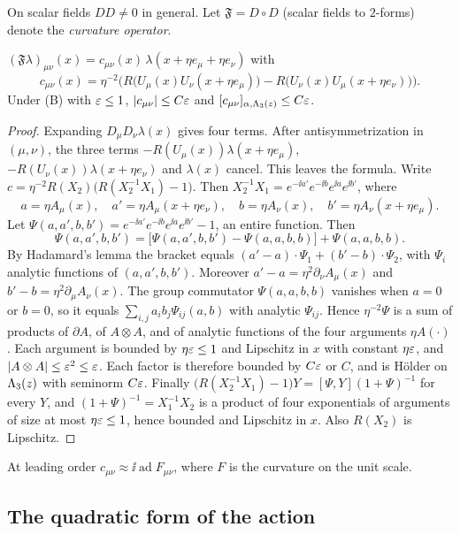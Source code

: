 On scalar fields $DD\ne0$ in general. Let $\mathfrak F=D\circ D$ (scalar fields to $2$-forms) denote the \emph{curvature operator}.

\begin{lemma}\label{lem:curvature}
$(\mathfrak F\lambda)_{\mu\nu}(x)=c_{\mu\nu}(x)\,\lambda(x+\eta e_\mu+\eta e_\nu)$ with
\[
c_{\mu\nu}(x)=\eta^{-2}\Big(R\big(U_\mu(x)U_\nu(x+\eta e_\mu)\big)-R\big(U_\nu(x)U_\mu(x+\eta e_\nu)\big)\Big).
\]
Under (B) with $\varepsilon\le1$, $|c_{\mu\nu}|\le C\varepsilon$ and $[c_{\mu\nu}]_{\alpha,\Lambda_3(z)}\le C\varepsilon$.
\end{lemma}

\begin{proof}
Expanding $D_\mu D_\nu\lambda(x)$ gives four terms. After antisymmetrization in $(\mu,\nu)$, the three terms $-R(U_\mu(x))\lambda(x+\eta e_\mu)$, $-R(U_\nu(x))\lambda(x+\eta e_\nu)$ and $\lambda(x)$ cancel. This leaves the formula. Write $c=\eta^{-2}R(X_2)\big(R(X_2^{-1}X_1)-1\big)$. Then $X_2^{-1}X_1=e^{-\ii a'}e^{-\ii b}e^{\ii a}e^{\ii b'}$, where
\[
a=\eta A_\mu(x),\quad a'=\eta A_\mu(x+\eta e_\nu),\quad b=\eta A_\nu(x),\quad b'=\eta A_\nu(x+\eta e_\mu).
\]
Let $\Psi(a,a',b,b')=e^{-\ii a'}e^{-\ii b}e^{\ii a}e^{\ii b'}-1$, an entire function. Then
\[
\Psi(a,a',b,b')=\big[\Psi(a,a',b,b')-\Psi(a,a,b,b)\big]+\Psi(a,a,b,b).
\]
By Hadamard's lemma the bracket equals $(a'-a)\cdot\Psi_1+(b'-b)\cdot\Psi_2$, with $\Psi_i$ analytic functions of $(a,a',b,b')$. Moreover $a'-a=\eta^2\partial_\nu A_\mu(x)$ and $b'-b=\eta^2\partial_\mu A_\nu(x)$. The group commutator $\Psi(a,a,b,b)$ vanishes when $a=0$ or $b=0$, so it equals $\sum_{i,j}a_ib_j\Psi_{ij}(a,b)$ with analytic $\Psi_{ij}$. Hence $\eta^{-2}\Psi$ is a sum of products of $\partial A$, of $A\otimes A$, and of analytic functions of the four arguments $\eta A(\cdot)$. Each argument is bounded by $\eta\varepsilon\le1$ and Lipschitz in $x$ with constant $\eta\varepsilon$, and $|A\otimes A|\le\varepsilon^2\le\varepsilon$. Each factor is therefore bounded by $C\varepsilon$ or $C$, and is H\"older on $\Lambda_3(z)$ with seminorm $C\varepsilon$. Finally $\big(R(X_2^{-1}X_1)-1\big)Y=[\Psi,Y](1+\Psi)^{-1}$ for every $Y$, and $(1+\Psi)^{-1}=X_1^{-1}X_2$ is a product of four exponentials of arguments of size at most $\eta\varepsilon\le1$, hence bounded and Lipschitz in $x$. Also $R(X_2)$ is Lipschitz.
\end{proof}

At leading order $c_{\mu\nu}\approx\ii\operatorname{ad}F_{\mu\nu}$, where $F$ is the curvature on the unit scale.

\subsection{The quadratic form of the action}\label{ss:12.4}

